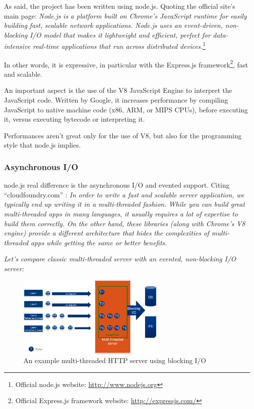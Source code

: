 As said, the project has been written using node.js. Quoting the official site's main page: \textit{Node.js is a platform built on Chrome's JavaScript runtime for easily building fast, scalable network applications. Node.js uses an event-driven, non-blocking I/O model that makes it lightweight and efficient, perfect for data-intensive real-time applications that run across distributed devices.}\footnote{Official node.js website: \url{http://www.nodejs.org}}

In other words, it is expressive, in particular with the Express.js framework\footnote{Official Express.js framework website: \url{http://expressjs.com/}}, fast and scalable. 

An important aspect is the use of the V8 JavaScript Engine to interpret the JavaScript code. Written by Google, it increases performance by compiling JavaScript to native machine code (x86, ARM, or MIPS CPUs)\cite{website:v8-intro}, before executing it, versus executing bytecode or interpreting it.

Performances aren't great only for the use of V8, but also for the programming style that node.js implies.

\subsubsection{Asynchronous I/O}
\label{sec:async}

node.js real difference is the asynchronous I/O and evented support. Citing ``cloudfoundry.com'' \cite{website:cloudfoundry}: \textit{In order to write a fast and scalable server application, we typically end up writing it in a multi-threaded fashion. While you can build great multi-threaded apps in many languages, it usually requires a lot of expertise to build them correctly. On the other hand, these libraries (along with Chrome’s V8 engine) provide a different architecture that hides the complexities of multi-threaded apps while getting the same or better benefits.}

\textit{Let's compare classic multi-threaded server with an evented, non-blocking I/O server:}

\begin{figure}[H]
\centering %
\includegraphics[height=150px]{img/multiThreadedServer.png}
\caption{An example multi-threaded HTTP server using blocking I/O}
\label{fig:multiThreadedServer}
\end{figure}

